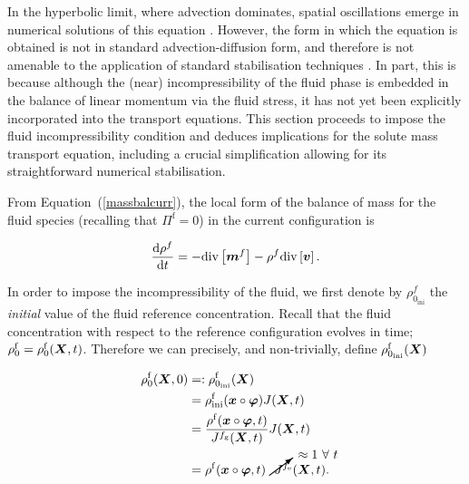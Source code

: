 \noindent In the hyperbolic limit, where advection dominates, spatial
oscillations emerge in numerical solutions of this equation
\citep{Brooks:82,Paper6}. However, the form in which the equation is
obtained is not in standard advection-diffusion form, and therefore is
not amenable to the application of standard stabilisation techniques
\citep{Paper6}. In part, this is because although the (near)
incompressibility of the fluid phase is embedded in the balance of
linear momentum via the fluid stress, it has not yet been explicitly
incorporated into the transport equations. This section proceeds to
impose the fluid incompressibility condition and deduces implications
for the solute mass transport equation, including a crucial
simplification allowing for its straightforward numerical
stabilisation.

From \mbox{Equation (\ref{massbalcurr})}, the local form of the
balance of mass for the fluid species (recalling that
$\Pi^\mathrm{f}=0$) in the current configuration is

\begin{equation}
\frac{\mathrm{d}\rho^f}{\mathrm{d}t} = - \mathrm{div}\left[\mbox{\boldmath$ m$}^f\right]
- \rho^f \mathrm{div}\left[\mbox{\boldmath$ v$}\right].
\label{fluidtransporteqn}
\end{equation}

\noindent In order to impose the incompressibility of the fluid, we
first denote by $\rho_{0_{\mathrm{ini}}}^{f}$ the {\sl initial} value
of the fluid reference concentration. Recall that the fluid
concentration with respect to the reference configuration evolves in
time; $\rho^\mathrm{f}_0 = \rho^\mathrm{f}_0(\mbox{\boldmath$ X$},t)$. Therefore we can
precisely, and non-trivially, define
$\rho_{0_{\mathrm{ini}}}^{\mathrm{f}}(\mbox{\boldmath$ X$})$   

\begin{equation}
\begin{split}
\rho_{0}^{\mathrm{f}}(\bX,0)
                   &=:\rho_{0_{\mathrm{ini}}}^{\mathrm{f}}(\bX)\\ 
                   &=\rho_{\mathrm{ini}}^{\mathrm{f}}(\bx\circ\Bvarphi)
                   J(\bX, t)\\ &=\frac{\rho^{\mathrm{f}}
                   (\bx\circ\Bvarphi,t)} {J^{f_\mathrm{g}}(\bX,t)}
                   J(\bX,t)\\ &=\rho^{\mathrm{f}} (\bx\circ\Bvarphi,t)
                   \cancelto{\approx 1\ \forall\ t}
                   {J^{f_\mathrm{e}}}(\bX,t).\\
\label{incompderiv}
\end{split}
\end{equation}

